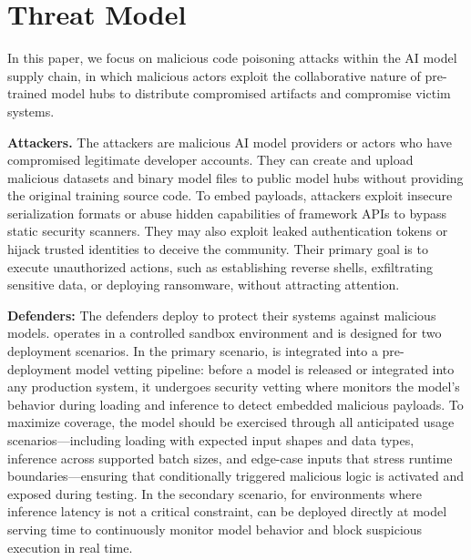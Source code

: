 \section{Threat Model}
\label{sec:threatmodel}

In this paper, we focus on malicious code poisoning attacks within the AI model supply chain, in which malicious actors exploit the collaborative nature of pre-trained model hubs to distribute compromised artifacts and compromise victim systems.

\noindent \textbf{Attackers.} The attackers are malicious AI model providers or actors who have compromised legitimate developer accounts\cite{10754708}. They can create and upload malicious datasets and binary model files to public model hubs without providing the original training source code. To embed payloads, attackers exploit insecure serialization formats\cite{liu2025arthideseekmaking} or abuse hidden capabilities of framework APIs\cite{zhu2025} to bypass static security scanners. They may also exploit leaked authentication tokens or hijack trusted identities to deceive the community\cite{3773117}. Their primary goal is to execute unauthorized actions, such as establishing reverse shells, exfiltrating sensitive data, or deploying ransomware, without attracting attention.

\noindent \textbf{Defenders:} The defenders deploy \toolname{} to protect their systems against malicious models. \toolname{} operates in a controlled sandbox environment and is designed for two deployment scenarios. In the primary scenario, \toolname{} is integrated into a pre-deployment model vetting pipeline: before a model is released or integrated into any production system, it undergoes security vetting where \toolname{} monitors the model's behavior during loading and inference to detect embedded malicious payloads. To maximize coverage, the model should be exercised through all anticipated usage scenarios—including loading with expected input shapes and data types, inference across supported batch sizes, and edge-case inputs that stress runtime boundaries—ensuring that conditionally triggered malicious logic is activated and exposed during testing\cite{11029791, zhang2025fixexploitenablingcomprehensive}. In the secondary scenario, for environments where inference latency is not a critical constraint, \toolname{} can be deployed directly at model serving time to continuously monitor model behavior and block suspicious execution in real time.